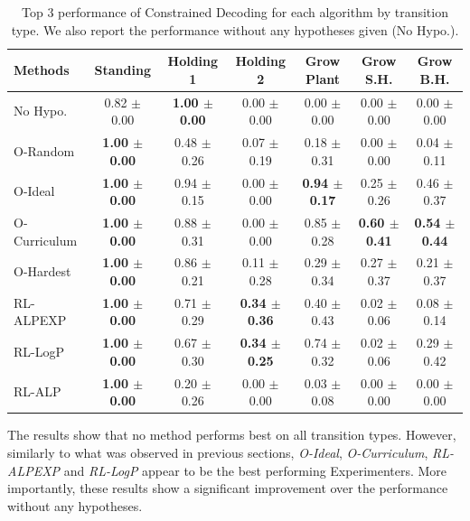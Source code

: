 \documentclass{article}
\begin{document}
\begin{table}[ht!]
\centering
{\tiny
\begin{tabular}{lcccccc}
\toprule
\textbf{Methods} & \textbf{Standing} & \textbf{Holding 1} & \textbf{Holding 2} & \textbf{Grow Plant} & \textbf{Grow S.H.} & \textbf{Grow B.H.} \\
\midrule
No Hypo. & 0.82 $\pm$ 0.00 & \textbf{1.00 $\pm$ 0.00} & 0.00 $\pm$ 0.00 & 0.00 $\pm$ 0.00 & 0.00 $\pm$ 0.00 & 0.00 $\pm$ 0.00 \\
\midrule
O-Random & \textbf{1.00 $\pm$ 0.00} & 0.48 $\pm$ 0.26 & 0.07 $\pm$ 0.19 & 0.18 $\pm$ 0.31 & 0.00 $\pm$ 0.00 & 0.04 $\pm$ 0.11 \\
O-Ideal & \textbf{1.00 $\pm$ 0.00} & 0.94 $\pm$ 0.15 & 0.00 $\pm$ 0.00 & \textbf{0.94 $\pm$ 0.17} & 0.25 $\pm$ 0.26 & 0.46 $\pm$ 0.37 \\
O-Curriculum & \textbf{1.00 $\pm$ 0.00} & 0.88 $\pm$ 0.31 & 0.00 $\pm$ 0.00 & 0.85 $\pm$ 0.28 & \textbf{0.60 $\pm$ 0.41} & \textbf{0.54 $\pm$ 0.44} \\
O-Hardest & \textbf{1.00 $\pm$ 0.00} & 0.86 $\pm$ 0.21 & 0.11 $\pm$ 0.28 & 0.29 $\pm$ 0.34 & 0.27 $\pm$ 0.37 & 0.21 $\pm$ 0.37 \\
\midrule
RL-ALPEXP & \textbf{1.00 $\pm$ 0.00} & 0.71 $\pm$ 0.29 & \textbf{0.34 $\pm$ 0.36} & 0.40 $\pm$ 0.43 & 0.02 $\pm$ 0.06 & 0.08 $\pm$ 0.14 \\
\midrule
RL-LogP & \textbf{1.00 $\pm$ 0.00} & 0.67 $\pm$ 0.30 & \textbf{0.34 $\pm$ 0.25} & 0.74 $\pm$ 0.32 & 0.02 $\pm$ 0.06 & 0.29 $\pm$ 0.42 \\
RL-ALP & \textbf{1.00 $\pm$ 0.00} & 0.20 $\pm$ 0.26 & 0.00 $\pm$ 0.00 & 0.03 $\pm$ 0.08 & 0.00 $\pm$ 0.00 & 0.00 $\pm$ 0.00 \\
\bottomrule
\end{tabular}}
\caption{Top 3 performance of Constrained Decoding for each algorithm by transition type. We also report the performance without any hypotheses given (No Hypo.).}
\label{tab:4-worldllm-constrained-decoding}
\end{table}

The results show that no method performs best on all transition types. However, similarly to what was observed in previous sections, \textit{O-Ideal}, \textit{O-Curriculum}, \textit{RL-ALPEXP} and \textit{RL-LogP} appear to be the best performing Experimenters. More importantly, these results show a significant improvement over the performance without any hypotheses.
\end{document}

